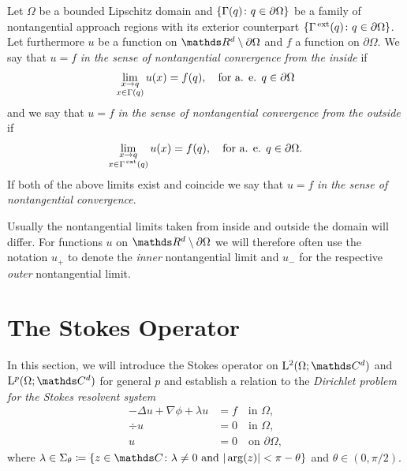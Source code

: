 \begin{defn}
  Let $\Omega$ be a bounded Lipschitz domain and $\{\Gamma(q) \colon q \in \partial\Omega\}$ be a family of nontangential approach regions with its exterior counterpart $\{\Gamma^{\,\mathrm{ext}}(q) \colon q \in \partial\Omega\}$.
  Let furthermore $u$ be a function on $\R^d \setminus \partial\Omega$ and $f$ a function on $\partial\Omega$.
  We say that $u = f$ \emph{in the sense of nontangential convergence from the inside} if 
  \begin{align*}
    \lim_{\substack{ x \to q \\ x \in \Gamma(q)}} u(x) = f(q), \quad\text{for a. e. } q \in \partial\Omega
  \end{align*}
  and we say that $u = f$ \emph{in the sense of nontangential convergence from the outside} if 
  \begin{align*}
    \lim_{\substack{ x \to q \\ x \in \Gamma^{\,\mathrm{ext}}(q)}} u(x) = f(q), \quad\text{for a. e. } q \in \partial\Omega.
  \end{align*}
  If both of the above limits exist and coincide we say that $u = f$ \emph{in the sense of nontangential convergence}.
\end{defn}

Usually the nontangential limits taken from inside and outside the domain will differ.
For functions $u$ on $\R^d \setminus \partial\Omega$ we will therefore often use the notation $u_+$ to denote the \emph{inner} nontangential limit and $u_-$ for the respective \emph{outer} nontangential limit.

\section{The Stokes Operator}
\label{sec:stokesOperator}

In this section, we will introduce the Stokes operator on $\Ell^2(\Omega; \C^d)$ and $\Ell^p(\Omega; \C^d)$ for general $p$ and establish a relation to the \emph{Dirichlet problem for the Stokes resolvent system}
\begin{align}
  -\Delta u + \nabla \phi + \lambda u &= f  \quad\text{in } \Omega, \nonumber\\
  \div u &= 0 \quad\text{in } \Omega, \label{eq:stokesResolventSystem} \\
  u &= 0 \quad\text{on } \partial\Omega, \nonumber
\end{align}
where $\lambda \in \Sigma_\theta \coloneqq \{ z \in \C \colon \lambda \neq 0 \text{ and } |\arg(z) | < \pi - \theta \}$ and $\theta \in (0, \pi/2)$.

